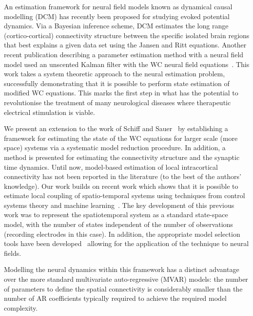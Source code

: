 \documentclass[10pt]{article}
\begin{document}
An estimation framework for neural field models known as dynamical causal modelling (DCM) \cite{David2003,David2006} has recently been proposed for studying evoked potential dynamics. Via a Bayesian inference scheme, DCM estimates the long range (cortico-cortical) connectivity structure between the specific isolated brain regions that best explains a given data set using the Jansen and Ritt equations. Another recent publication describing a parameter estimation method with a neural field model used an unscented Kalman filter with the WC neural field equations~\cite{schiff2008kalman}. This work takes a system theoretic approach to the neural estimation problem, successfully demonstrating that it is possible to perform state estimation of modified WC equations. This marks the first step in what has the potential to revolutionise the treatment of many neurological diseases where therapeutic electrical stimulation is viable.

We present an extension to the work of Schiff and Sauer~\cite{schiff2008kalman} by establishing a framework for estimating the state of the WC equations for larger scale (more space) systems via a systematic model reduction procedure. In addition, a method is presented for estimating the connectivity structure and the synaptic time dynamics. Until now, model-based estimation of local intracortical connectivity has not been reported in the literature (to the best of the authors' knowledge). Our work builds on recent work which shows that it is possible to estimate local coupling of spatio-temporal systems using techniques from control systems theory and machine learning~\cite{Dewar2009}. The key development of this previous work was to represent the spatiotemporal system as a standard state-space model, with the number of states independent of the number of observations (recording electrodes in this case). In addition, the appropriate model selection tools have been developed~\cite{Scerri2009} allowing for the application of the technique to neural fields. 

Modelling the neural dynamics within this framework has a distinct advantage over the more standard multivariate auto-regressive (MVAR) models: the number of parameters to define the spatial connectivity is considerably smaller than the number of AR coefficients typically required to achieve the required model complexity. 
\end{document}
